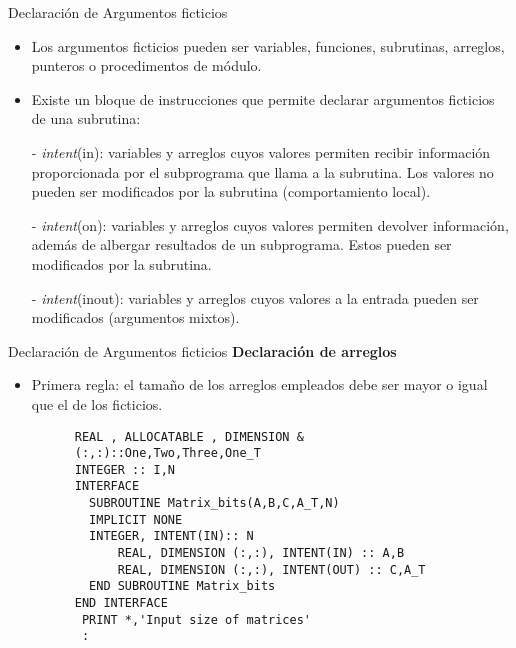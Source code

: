 \begin{frame}[fragile]{Declaración de Argumentos ficticios}
 \begin{itemize}[<+(0)->]
  \item Los argumentos ficticios pueden ser variables, funciones, subrutinas, arreglos, punteros o procedimentos de módulo.
  \item Existe un bloque de instrucciones que permite declarar argumentos ficticios de una subrutina:
  \item [-] \emph{intent}(in): variables y arreglos cuyos valores permiten recibir información proporcionada por el subprograma que llama a la subrutina. Los valores no pueden ser modificados por la subrutina (comportamiento local).
  \item [-] \emph{intent}(on): variables y arreglos cuyos valores permiten devolver información, además de albergar resultados de un subprograma. Estos pueden ser modificados por la subrutina.
  \item [-] \emph{intent}(inout): variables y arreglos cuyos valores a la entrada pueden ser modificados (argumentos mixtos).
 \end{itemize}
\end{frame}

\begin{frame}[fragile]{Declaración de Argumentos ficticios}
\textbf{Declaración de arreglos}
 \begin{itemize}[<+(1)->]
  \item Primera regla: el tamaño de los arreglos empleados debe ser mayor o igual que el de los ficticios.  
   \vspace{0.15cm}
      \begin{verbatim}
      REAL , ALLOCATABLE , DIMENSION &
      (:,:)::One,Two,Three,One_T
      INTEGER :: I,N
      INTERFACE
        SUBROUTINE Matrix_bits(A,B,C,A_T,N)
        IMPLICIT NONE
        INTEGER, INTENT(IN):: N
            REAL, DIMENSION (:,:), INTENT(IN) :: A,B
            REAL, DIMENSION (:,:), INTENT(OUT) :: C,A_T
        END SUBROUTINE Matrix_bits
      END INTERFACE
       PRINT *,'Input size of matrices'
       :
      \end{verbatim} 
 \end{itemize}
\end{frame}


